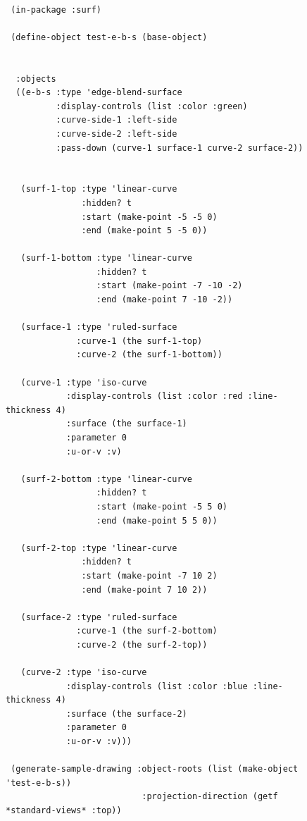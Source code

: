 \documentclass [11pt]{book}
\begin{document}
\begin{itemize}
\begin{description}
\end{description}




\begin{figure}
\begin{lrbox}{\boxedverb}
\begin{minipage}{\linewidth}
{\small

\begin{verbatim}

 (in-package :surf)

 (define-object test-e-b-s (base-object)
  
  
  :objects
  ((e-b-s :type 'edge-blend-surface
          :display-controls (list :color :green)
          :curve-side-1 :left-side
          :curve-side-2 :left-side
          :pass-down (curve-1 surface-1 curve-2 surface-2))
                                    
   
   (surf-1-top :type 'linear-curve
               :hidden? t
               :start (make-point -5 -5 0)
               :end (make-point 5 -5 0))
    
   (surf-1-bottom :type 'linear-curve
                  :hidden? t
                  :start (make-point -7 -10 -2)
                  :end (make-point 7 -10 -2))
    
   (surface-1 :type 'ruled-surface
              :curve-1 (the surf-1-top)
              :curve-2 (the surf-1-bottom))
    
   (curve-1 :type 'iso-curve
            :display-controls (list :color :red :line-thickness 4)
            :surface (the surface-1)
            :parameter 0
            :u-or-v :v)
    
   (surf-2-bottom :type 'linear-curve
                  :hidden? t
                  :start (make-point -5 5 0)
                  :end (make-point 5 5 0))
    
   (surf-2-top :type 'linear-curve
               :hidden? t
               :start (make-point -7 10 2)
               :end (make-point 7 10 2))
    
   (surface-2 :type 'ruled-surface
              :curve-1 (the surf-2-bottom)
              :curve-2 (the surf-2-top))
    
   (curve-2 :type 'iso-curve
            :display-controls (list :color :blue :line-thickness 4)
            :surface (the surface-2)
            :parameter 0
            :u-or-v :v)))

 (generate-sample-drawing :object-roots (list (make-object 'test-e-b-s))
                           :projection-direction (getf *standard-views* :top))


\end{verbatim}}
\end{minipage}
\end{lrbox}
\end{figure}
\end{itemize}
\end{document}
